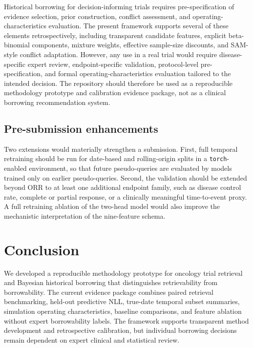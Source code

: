 \documentclass[11pt]{article}
\begin{document}
Historical borrowing for decision-informing trials requires pre-specification of evidence selection, prior construction, conflict assessment, and operating-characteristics evaluation. The present framework supports several of these elements retrospectively, including transparent candidate features, explicit beta-binomial components, mixture weights, effective sample-size discounts, and SAM-style conflict adaptation. However, any use in a real trial would require disease-specific expert review, endpoint-specific validation, protocol-level pre-specification, and formal operating-characteristics evaluation tailored to the intended decision. The repository should therefore be used as a reproducible methodology prototype and calibration evidence package, not as a clinical borrowing recommendation system.

\subsection{Pre-submission enhancements}

Two extensions would materially strengthen a submission. First, full temporal retraining should be run for date-based and rolling-origin splits in a \texttt{torch}-enabled environment, so that future pseudo-queries are evaluated by models trained only on earlier pseudo-queries. Second, the validation should be extended beyond ORR to at least one additional endpoint family, such as disease control rate, complete or partial response, or a clinically meaningful time-to-event proxy. A full retraining ablation of the two-head model would also improve the mechanistic interpretation of the nine-feature schema.

\section{Conclusion}

We developed a reproducible methodology prototype for oncology trial retrieval and Bayesian historical borrowing that distinguishes retrievability from borrowability. The current evidence package combines paired retrieval benchmarking, held-out predictive NLL, true-date temporal subset summaries, simulation operating characteristics, baseline comparisons, and feature ablation without expert borrowability labels. The framework supports transparent method development and retrospective calibration, but individual borrowing decisions remain dependent on expert clinical and statistical review.
\end{document}
